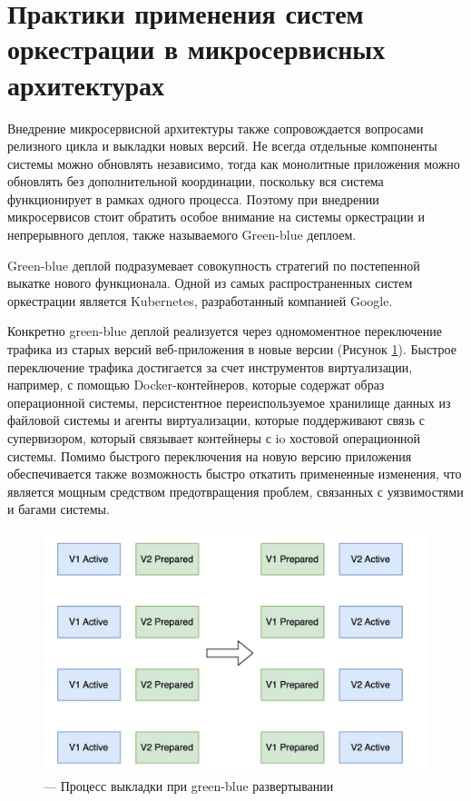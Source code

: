 \section{Практики применения систем оркестрации в микросервисных архитектурах}
Внедрение микросервисной архитектуры также сопровождается вопросами релизного цикла и выкладки новых версий. Не всегда отдельные компоненты 
системы можно обновлять независимо, тогда как монолитные приложения можно обновлять без дополнительной координации, поскольку вся
система функционирует в рамках одного процесса. Поэтому при внедрении микросервисов стоит обратить особое внимание на системы оркестрации
и непрерывного деплоя, также называемого Green-blue деплоем. 

Green-blue деплой подразумевает совокупность стратегий по постепенной выкатке нового функционала. Одной из
самых распространенных систем оркестрации является Kubernetes, разработанный компанией Google.

Конкретно green-blue деплой реализуется через одномоментное переключение трафика из старых версий веб-приложения
в новые версии (Рисунок \ref{fig:gb}). Быстрое переключение трафика достигается за счет инструментов виртуализации, например, с помощью Docker-контейнеров,
которые содержат образ операционной системы, персистентное переиспользуемое хранилище данных из файловой системы и агенты виртуализации, которые
поддерживают связь с супервизором, который связывает контейнеры с io хостовой операционной системы.
Помимо быстрого переключения на новую версию приложения обеспечивается также возможность быстро откатить
примененные изменения, что является мощным средством предотвращения проблем, связанных с уязвимостями и багами
системы. 
\begin{figure}[H]
    \centering
    \includegraphics[width=0.8\linewidth]{img/gb.jpg}
    \caption{--- Процесс выкладки при green-blue развертывании}
    \label{fig:gb}
\end{figure}

